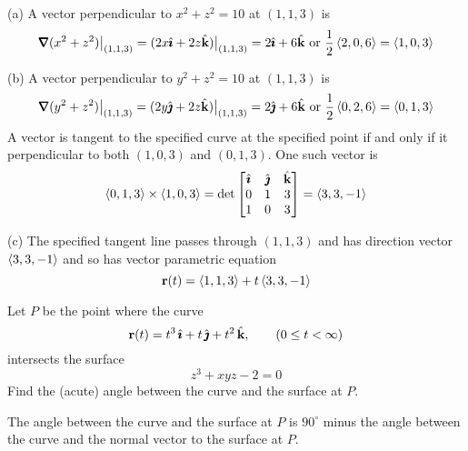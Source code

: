 \begin{solution}
(a) 
A vector perpendicular to $x^2+z^2=10$ at $(1,1,3)$ is
\begin{equation*}
\vnabla(x^2+z^2)\big|_{(1,1,3)}
=(2x\hi+2z\hk)\big|_{(1,1,3)}
=2\hi+6\hk\hbox{ or }
\frac{1}{2} \llt 2,0,6\rgt=\llt 1,0,3\rgt
\end{equation*}

(b) A vector perpendicular to $y^2+z^2=10$ at $(1,1,3)$ is
\begin{equation*}
\vnabla(y^2+z^2)\big|_{(1,1,3)}
=(2y\hj+2z\hk)\big|_{(1,1,3)}
=2\hj+6\hk\hbox{ or }\frac{1}{2} \llt 0,2,6\rgt=\llt 0,1,3\rgt
\end{equation*}
A vector is tangent to the specified curve at the specified point if and only
if it  perpendicular to both $(1,0,3)$ and $(0,1,3)$. One such vector is
\begin{equation*}
\left< 0,1,3\right>\times\left<1,0,3\right>
=\det\left[\begin{matrix}
                     \hat{\pmb{\imath}} & \hat{\pmb{\jmath}} & \hat{\mathbf{k}} \\
                     0   &  1  & 3 \\
                     1   &  0  & 3
                \end{matrix}\right]
=\left< 3,3,-1\right>
\end{equation*}

(c) The specified tangent line passes through $(1,1,3)$ and has direction
vector $\left< 3,3,-1\right>$ and so has vector parametric equation
\begin{equation*}
\mathbf{r}(t)=\left< 1,1,3\right>+t\left< 3,3,-1\right>
\end{equation*}
\end{solution}

\begin{question}[M200 2000A] %
Let $P$ be the point where the curve 
\begin{equation*}
\mathbf{r}(t) = t^3\,\hat{\pmb{\imath}} + t\,\hat{\pmb{\jmath}} + t^2\,\hat{\mathbf{k}},\qquad (0 \le t <\infty)
\end{equation*}
 intersects the surface 
\begin{equation*}
z^3 + xyz -2 = 0
\end{equation*}
Find the (acute) angle between the curve and the surface at $P$. 
\end{question}

\begin{hint}
 The angle between the curve and the surface at $P$ is $90^\circ$
minus the angle between the curve and the normal vector to the surface at $P$.
\end{hint}

